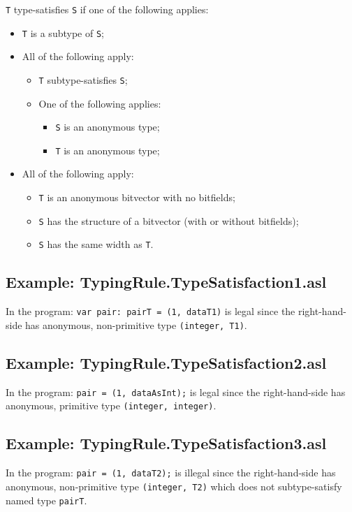 \documentclass{book}
\begin{document}
\texttt{T} type-satisfies \texttt{S} if one of the following applies:
 \begin{itemize}
 \item \texttt{T} is a subtype of \texttt{S};
 \item All of the following apply:
    \begin{itemize}
    \item \texttt{T} subtype-satisfies \texttt{S};
    \item One of the following applies:
      \begin{itemize}
      \item \texttt{S} is an anonymous type;
      \item \texttt{T} is an anonymous type;
      \end{itemize}
    \end{itemize}
  \item All of the following apply:
    \begin{itemize}
    \item \texttt{T} is an anonymous bitvector with no bitfields;
    \item \texttt{S} has the structure of a bitvector (with or without bitfields);
    \item \texttt{S} has the same width as \texttt{T}.
    \end{itemize}
  \end{itemize}

\subsection{Example: TypingRule.TypeSatisfaction1.asl}
    In the program:
    \texttt{var pair: pairT = (1, dataT1)} is legal since the right-hand-side has
    anonymous, non-primitive type \texttt{(integer, T1)}.

\subsection{Example: TypingRule.TypeSatisfaction2.asl}
    In the program:
    \texttt{pair = (1, dataAsInt);} is legal since the right-hand-side has anonymous,
    primitive type \texttt{(integer, integer)}.
 
\subsection{Example: TypingRule.TypeSatisfaction3.asl}
    In the program:
    \texttt{pair = (1, dataT2);} is illegal since the right-hand-side has anonymous,
    non-primitive type \texttt{(integer, T2)} which does not subtype-satisfy named
    type \texttt{pairT}.
\end{document}
